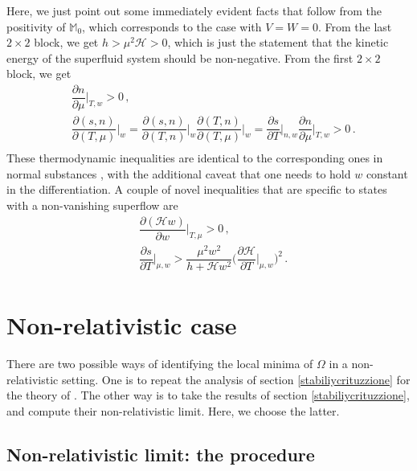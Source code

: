 \documentclass[a4paper, amsfonts, amssymb, amsmath, reprint, showkeys, nofootinbib, twoside,notitlepage,onecolumn]{revtex4-2}
\theoremstyle{definition}
\theoremstyle{theorem}
\theoremstyle{corollary}
\begin{document}
Here, we just point out some immediately evident facts that follow from the positivity of $\mathbb{M}_0$, which corresponds to the case with $V=W=0$. From the last $2\times 2$ block, we get $h>\mu^2 \mathcal{H}>0$, which is just the statement that the kinetic energy of the superfluid system should be non-negative. From the first $2\times 2$ block, we get
\begin{equation}
\begin{split}
& \dfrac{\partial n}{\partial \mu}\bigg|_{T,w}>0\, , \\
& \dfrac{\partial (s,n)}{\partial (T,\mu)}\bigg|_{w}= \dfrac{\partial (s,n)}{\partial (T,n)}\bigg|_{w}\dfrac{\partial (T,n)}{\partial (T,\mu)}\bigg|_{w}=\dfrac{\partial s}{\partial T}\bigg|_{n,w} \dfrac{\partial n}{\partial \mu}\bigg|_{T,w} >0\, .  \\
\end{split}
\end{equation}
These thermodynamic inequalities are identical to the corresponding ones in normal substances \cite{landau5}, with the additional caveat that one needs to hold $w$ constant in the differentiation. A couple of novel inequalities that are specific to states with a non-vanishing superflow are
\begin{equation}
\begin{split}
& \dfrac{\partial (\mathcal{H}w)}{\partial w}\bigg|_{T,\mu} >0 \, , \\
& \dfrac{\partial s}{\partial T}\bigg|_{\mu, w} > \dfrac{\mu^2 w^2}{h{+}\mathcal{H}w^2} \bigg( \dfrac{\partial \mathcal{H}}{\partial T}\bigg|_{\mu,w} \bigg)^2 \, . \\
\end{split}
\end{equation}


\section{Non-relativistic case}\label{nonrellimitsect}
\vspace{-0.2cm}

There are two possible ways of identifying the local minima of $\Omega$ in a non-relativistic setting. One is to repeat the analysis of section \ref{stabiliycrituzzione} for the theory of \citet{AndreevBash1975}. The other way is to take the results of section \ref{stabiliycrituzzione}, and compute their non-relativistic limit. Here, we choose the latter.

\vspace{-0.3cm}
\subsection{Non-relativistic limit: the procedure}
\vspace{-0.2cm}
\end{document}
